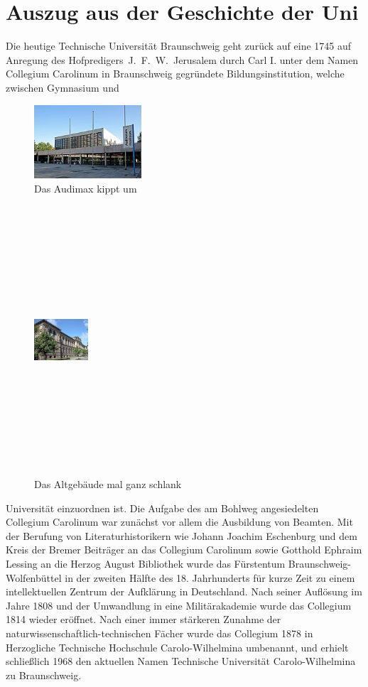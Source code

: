 \documentclass[12pt,a4paper, bibliography=totoc]{scrbook}
\begin{document}
\section{Auszug aus der Geschichte der Uni}
Die heutige Technische Universität Braunschweig geht zurück auf eine 1745  auf Anregung des Hofpredigers~J.~F.~W.~Jerusalem durch Carl I. unter dem Namen Collegium Caroli\-num in Braunschweig gegründete 
Bildungsinstitution, welche zwischen Gymnasium und

\begin{figure}[h]
	\begin{center}
		\includegraphics[width=4cm, angle=45]{audimax}
		\caption{Das Audimax kippt um}
	\end{center}
\end{figure}
\newpage
\begin{figure}[h]
	\begin{center}
		\includegraphics[width=2cm, height=10cm]{tu}
		\caption{Das Altgebäude mal ganz schlank}
	\end{center}
\end{figure}

\noindent Universität einzuordnen ist. Die Aufgabe des am Bohlweg angesiedelten Collegium Carolinum war
zunächst vor allem die Ausbildung von Beamten. Mit der Berufung von Literaturhistorikern wie Johann Joachim Eschenburg und dem Kreis der Bremer
Beiträger an das Collegium Carolinum sowie Gotthold Ephraim Lessing an die Herzog August Bibliothek wurde das Fürstentum Braunschweig-Wolfenbüttel in der zweiten Hälfte des 18. Jahrhunderts für kurze Zeit zu einem intellektuellen Zentrum der Aufklärung in Deutschland. Nach seiner Auflösung im Jahre 1808 und der Umwandlung in eine Militärakademie wurde das Collegium 1814 wieder eröffnet. Nach einer immer stärkeren Zunahme der naturwissenschaftlich-technischen Fächer wurde das Collegium 1878 in Herzogliche Technische Hochschule Carolo-Wilhelmina umbenannt, und erhielt schließlich 1968 den aktuellen Namen Technische Universität Carolo-Wilhelmina zu Braunschweig.
\end{document}
